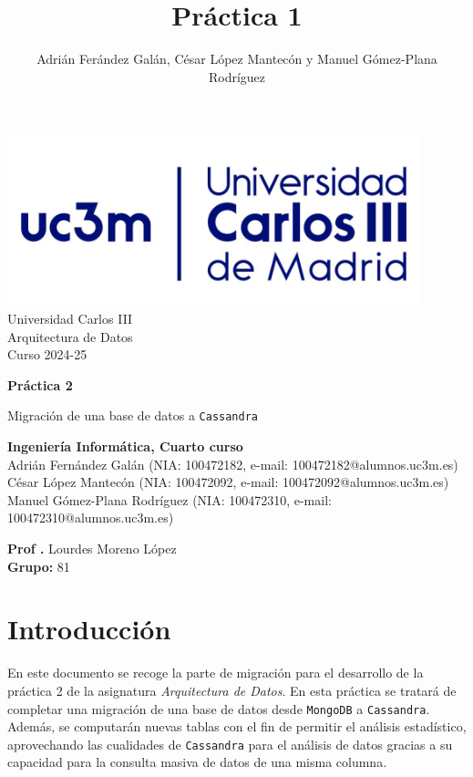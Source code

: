 \documentclass[]{article}
\title{Práctica 1}
\author{Adrián Ferández Galán, César López Mantecón y Manuel Gómez-Plana Rodríguez}
\begin{document}
\begin{titlepage}
    \centering
   \includegraphics[width=0.9\textwidth]{uc3m.jpg} 
    {\Huge Universidad Carlos III\\
    
     \Large Arquitectura de Datos\\
     \vspace{0.5cm}
     Curso 2024-25}
    \vspace{2cm}

    {\Huge \textbf{Práctica 2} \par}
    \vspace{0.5cm}
    {\Large Migración de una base de datos a \texttt{Cassandra} \par}
    \vspace{8cm}

   \textbf{Ingeniería Informática, Cuarto curso}\\
    \vspace{0.2cm} 
    Adrián Fernández Galán       (NIA: 100472182, e-mail: 100472182@alumnos.uc3m.es)\\
    César López Mantecón         (NIA: 100472092, e-mail: 100472092@alumnos.uc3m.es)\\
    Manuel Gómez-Plana Rodríguez (NIA: 100472310, e-mail: 100472310@alumnos.uc3m.es)
    \vspace{0.5cm}

   
    \textbf{Prof .} Lourdes Moreno López\\
    
    \textbf{Grupo: } 81   
    
\end{titlepage}
\newpage

\renewcommand{\contentsname}{\centering Índice}

\hypersetup{linkcolor=black}
\tableofcontents
\hypersetup{linkcolor=blue}
\newpage

\section{Introducción}
\label{sec:introduccion}
En este documento se recoge la parte de migración para el desarrollo de la práctica 2 de la asignatura
\textit{Arquitectura de Datos}. En esta práctica se tratará de completar una
migración de una base de datos desde \texttt{MongoDB} a \texttt{Cassandra}.
Además, se computarán nuevas tablas con el fin de permitir el análisis
estadístico, aprovechando las cualidades de \texttt{Cassandra} para el análisis
de datos gracias a su capacidad para la consulta masiva de datos de una misma
columna.
\end{document}
